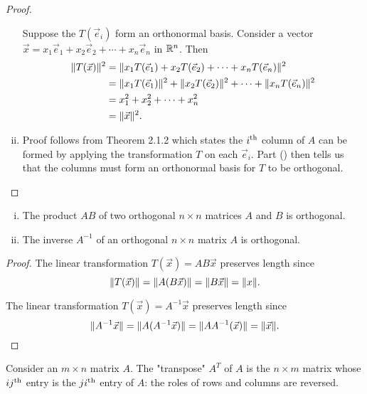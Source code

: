 \documentclass[a4paper,11pt]{article}
\begin{document}
\begin{outline}
\begin{proof}
\begin{enumerate}[i.]
          \backward Suppose the \(T(\vec{e}_i)\) form an orthonormal basis. Consider a vector \(\vec{x} = x_1\vec{e}_1 + x_2\vec{e}_2 + \cdots
          + x_n\vec{e}_n\) in \(\mathbb{R}^n\). Then
          \begin{align*}
            \|T(\vec{x})\|^2 &= \|x_1T(\vec{e}_1) + x_2T(\vec{e}_2) + \cdots + x_nT(\vec{e}_n)\|^2 \\
                                &= \|x_1T(\vec{e}_1)\|^2 + \|x_2T(\vec{e}_2)\|^2 + \cdots + \|x_nT(\vec{e}_n)\|^2 \\
                                &= x_1^2 + x_2^2 + \cdots + x_n^2 \\
                                &= \|\vec{x}\|^2\text{.}
          \end{align*}
        \item
          Proof follows from Theorem 2.1.2 which states the \(i\textsuperscript{th}\) column of \(A\) can be formed by applying the transformation \(T\) on each
          \(\vec{e}_i\). Part () then tells us that the columns must form an orthonormal basis for \(T\) to be orthogonal.
      \end{enumerate}
    \end{proof}

    \begin{enumerate}[i.]
      \item The product \(AB\) of two orthogonal \(n \times n\) matrices \(A\) and \(B\) is orthogonal.
      \item The inverse \(A^{-1}\) of an orthogonal \(n \times n\) matrix \(A\) is orthogonal.
    \end{enumerate}

    \begin{proof}
      \item
        The linear transformation \(T(\vec{x}) = AB\vec{x}\) preserves length since
        \[ \|T(\vec{x})\| = \|A(B\vec{x})\| = \|B\vec{x}\| = \|x\|\text{.} \]
      \item
        The linear transformation \(T(\vec{x}) = A^{-1}\vec{x}\) preserves length since
        \[ \|A^{-1}\vec{x}\| = \|A(A^{-1}\vec{x})\| = \|AA^{-1}(\vec{x})\| = \|\vec{x}\|\text{.} \]
    \end{proof}

    Consider an \(m \times n\) matrix \(A\). The "transpose" \(A^T\) of \(A\) is the \(n \times m\) matrix whose \(ij\textsuperscript{th}\)
    entry is the \(ji\textsuperscript{th}\) entry of \(A\): the roles of rows and columns are reversed.


\end{outline}
\end{document}

